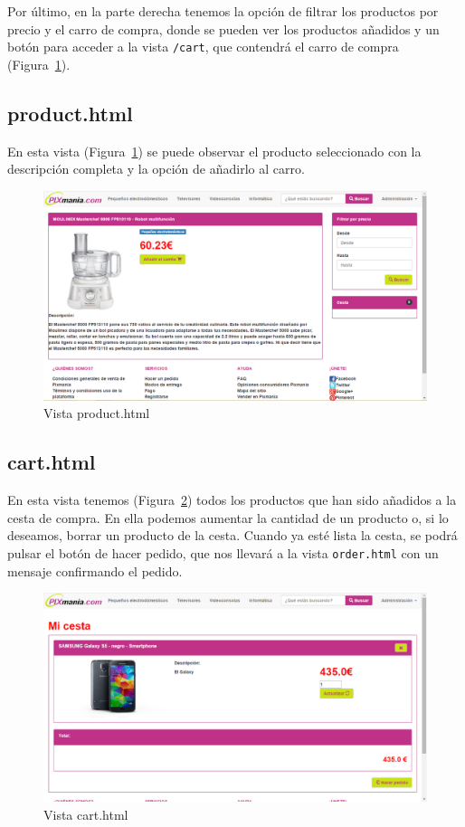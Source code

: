 \documentclass[12pt,a4paper,svgnames]{article}
\begin{document}
Por último, en la parte derecha tenemos la opción de filtrar los productos por precio y el carro de compra, donde se pueden ver los productos añadidos y un botón para acceder a la vista \texttt{/cart}, que contendrá el carro de compra (Figura~\ref{fig:moreInformation}).

\clearpage

\subsection{product.html}
En esta vista (Figura~\ref{fig:moreInformation}) se puede observar el producto seleccionado con la descripción completa y la opción de añadirlo al carro.

\begin{figure}[htbp]
	\centering
	\includegraphics[width=1\linewidth]{imagenes/moreInformation}
	\caption{Vista product.html}
	\label{fig:moreInformation}
\end{figure}

\subsection{cart.html}
En esta vista tenemos (Figura~\ref{fig:cart}) todos los productos que han sido añadidos a la cesta de compra. En ella podemos aumentar la cantidad de un producto o, si lo deseamos, borrar un producto de la cesta. Cuando ya esté lista la cesta, se podrá pulsar el botón de hacer pedido, que nos llevará a la vista \texttt{order.html} con un mensaje confirmando el pedido.


\begin{figure}[htbp]
	\centering
	\includegraphics[width=1\linewidth]{imagenes/cart}
	\caption{Vista cart.html}
	\label{fig:cart}
\end{figure}
\end{document}
